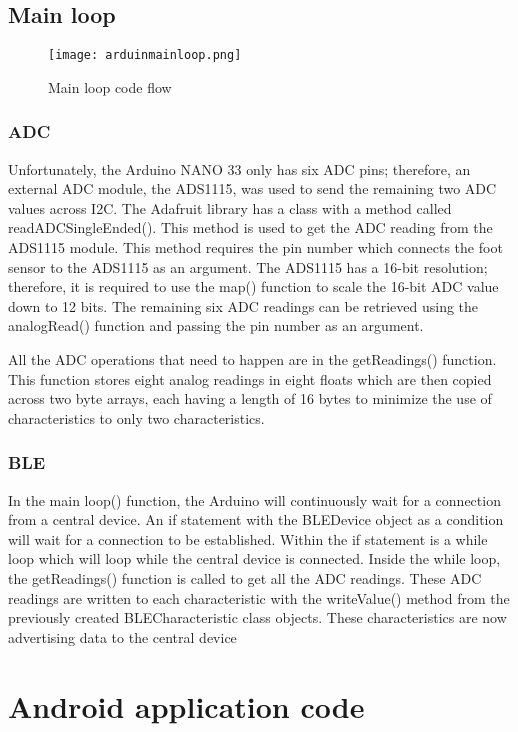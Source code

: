 \subsection{Main loop}
\begin{figure}[!htb]
  \centering
  \texttt{[image: arduinmainloop.png]}
  \caption{Main loop code flow}
  \label{fig:mainloop}
\end{figure}
\subsubsection{ADC} 

Unfortunately, the Arduino NANO 33 only has six ADC pins; therefore, an external ADC module, the ADS1115, was used to send the remaining two ADC values across I2C. The Adafruit library has a class with a method called readADCSingleEnded(). This method is used to get the ADC reading from the ADS1115 module. This method requires the pin number which connects the foot sensor to the ADS1115 as an argument. The ADS1115 has a 16-bit resolution; therefore, it is required to use the map() function to scale the 16-bit ADC value down to 12 bits. The remaining six ADC readings can be retrieved using the analogRead() function and passing the pin number as an argument.

All the ADC operations that need to happen are in the getReadings() function. This function stores eight analog readings in eight floats which are then copied across two byte arrays, each having a length of 16 bytes to minimize the use of characteristics to only two characteristics.

\subsubsection{BLE}

In the main loop() function, the Arduino will continuously wait for a connection from a central device. An if statement with the BLEDevice object as a condition will wait for a connection to be established. Within the if statement is a while loop which will loop while the central device is connected. Inside the while loop, the getReadings() function is called to get all the ADC readings. These ADC readings are written to each characteristic with the writeValue() method from the previously created BLECharacteristic class objects. These characteristics are now advertising data to the central device



\section{Android application code}
